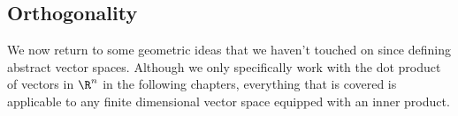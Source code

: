 % 
%
%

\begin{partbacktext}
\part{Orthogonality}
\noindent  We now return to some geometric ideas that we haven't touched on since defining abstract vector spaces.  Although we only specifically work with the dot product of vectors in $\R^n$ in the following chapters, everything that is covered is applicable to any finite dimensional vector space equipped with an inner product.

\end{partbacktext}
